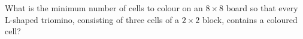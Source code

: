 What is the minimum number of cells to colour on an $8\times8$ board so that every L-shaped triomino, consisting of three cells of a $2\times2$ block, contains a coloured cell?
